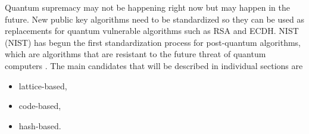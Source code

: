 Quantum supremacy may not be happening right now but may happen in the future. New public key algorithms need to be standardized so they can be used as replacements for quantum vulnerable algorithms such as RSA and ECDH. NIST (\acl{NIST}) has begun the first standardization process for post-quantum algorithms, which are algorithms that are resistant to the future threat of quantum computers \cite{Chen2016}. The main candidates that will be described in individual sections are
\begin{itemize}
  \item lattice-based,
  \item code-based,
  \item hash-based.
\end{itemize}
